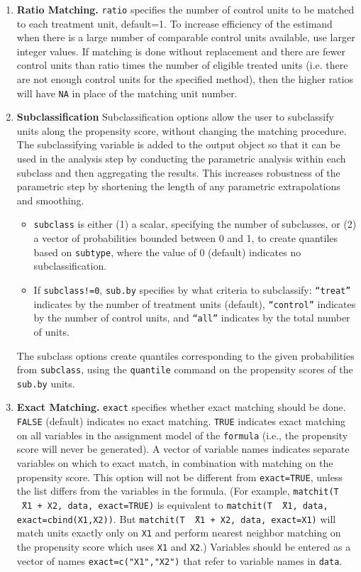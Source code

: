 \documentclass[oneside,letterpaper,titlepage]{article}
\begin{document}
\begin{enumerate}
\item \textbf{Ratio Matching.}  \texttt{ratio} specifies the number of
  control units to be matched to each treatment unit, default=1.  To
  increase efficiency of the estimand when there is a large number of
  comparable control units available, use larger integer values. If
  matching is done without replacement and there are fewer control
  units than ratio times the number of eligible treated units (i.e.
  there are not enough control units for the specified method), then
  the higher ratios will have \texttt{NA} in place of the matching
  unit number.
  
\item \textbf{Subclassification} Subclassification options allow the
  user to subclassify units along the propensity score, without
  changing the matching procedure.  The subclassifying variable is
  added to the output object so that it can be used in the analysis
  step by conducting the parametric analysis within each subclass and
  then aggregating the results.  This increases robustness of the
  parametric step by shortening the length of any parametric
  extrapolations and smoothing.
  \begin{itemize}
  \item \texttt{subclass} is either (1) a scalar, specifying the
    number of subclasses, or (2) a vector of probabilities bounded
    between 0 and 1, to create quantiles based on \texttt{subtype},
    where the value of 0 (default) indicates no subclassification.
  \item If \texttt{subclass!=0}, \texttt{sub.by} specifies by what
    criteria to subclassify: \texttt{``treat''} indicates by the
    number of treatment units (default), \texttt{``control''}
    indicates by the number of control units, and \texttt{``all''}
    indicates by the total number of units.
  \end{itemize}
  The subclass options create quantiles corresponding to the given
  probabilities from \texttt{subclass}, using the \texttt{quantile}
  command on the propensity scores of the \texttt{sub.by} units.
  
\item \textbf{Exact Matching.}  \texttt{exact} specifies whether exact
  matching should be done.  \texttt{FALSE} (default) indicates no
  exact matching.  \texttt{TRUE} indicates exact matching on all
  variables in the assignment model of the \texttt{formula} (i.e., the
  propensity score will never be generated).  A vector of variable
  names indicates separate variables on which to exact match, in
  combination with matching on the propensity score.  This option will
  not be different from \texttt{exact=TRUE}, unless the list differs
  from the variables in the formula.  (For example, \texttt{matchit(T
    \~\ X1 + X2, data, exact=TRUE)} is equivalent to \texttt{matchit(T
    \~\ X1, data, exact=cbind(X1,X2))}.  But \texttt{matchit(T \~\ X1
    + X2, data, exact=X1)} will match units exactly only on
  \texttt{X1} and perform nearest neighbor matching on the propensity
  score which uses \texttt{X1} and \texttt{X2}.)  Variables should be
  entered as a vector of names \texttt{exact=c("X1","X2")} that refer
  to variable names in \texttt{data}.
  

\end{enumerate}
\end{document}
